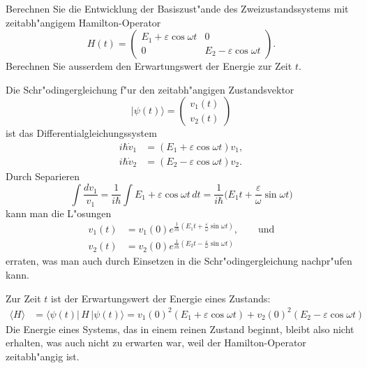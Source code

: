 Berechnen Sie die Entwicklung der Basiszust"ande des Zweizustandssystems
mit zeitabh"angigem Hamilton-Operator
\[
H(t)
=
\begin{pmatrix}
E_1+\varepsilon\cos\omega t & 0                          \\
0                           & E_2-\varepsilon\cos\omega t
\end{pmatrix}.
\]
Berechnen Sie ausserdem den Erwartungswert der Energie zur Zeit $t$.

\begin{loesung}
Die Schr"odingergleichung f"ur den zeitabh"angigen Zustandsvektor
\[
|\psi(t)\rangle
=
\begin{pmatrix}
v_1(t) \\
v_2(t)
\end{pmatrix}
\]
ist das Differentialgleichungssystem
\begin{align*}
i\hbar\dot v_1&=(E_1+\varepsilon\cos\omega t)v_1,\\
i\hbar\dot v_2&=(E_2-\varepsilon\cos\omega t)v_2.
\end{align*}
Durch Separieren
\[
\int\frac{dv_1}{v_1}
=
\frac{1}{i\hbar}\int E_1 + \varepsilon\cos\omega t\,dt
=
\frac1{i\hbar}\biggl(E_1t+\frac{\varepsilon}{\omega}\sin\omega t\biggr)
\]
kann man die L"osungen
\begin{align*}
v_1(t)
&=
v_1(0)e^{\frac1{i\hbar}(E_1t+\frac{\varepsilon}{\omega}\sin\omega t)}
,\qquad\text{und}
\\
v_2(t)
&=
v_2(0)e^{\frac1{i\hbar}(E_2t-\frac{\varepsilon}{\omega}\sin\omega t)}
\end{align*}
erraten, was man auch durch Einsetzen in die Schr"odingergleichung
nachpr"ufen kann.

Zur Zeit $t$ ist der Erwartungswert der Energie eines Zustands:
\begin{align*}
\langle H\rangle
&=
\langle\psi(t)|\,H\,|\psi(t)\rangle
=
v_1(0)^2(E_1+\varepsilon\cos\omega t)
+
v_2(0)^2(E_2-\varepsilon\cos\omega t)
\end{align*}
Die Energie eines Systems, das in einem reinen  Zustand beginnt,
bleibt also nicht erhalten, was auch nicht zu erwarten war,
weil der Hamilton-Operator zeitabh"angig ist.
\end{loesung}

